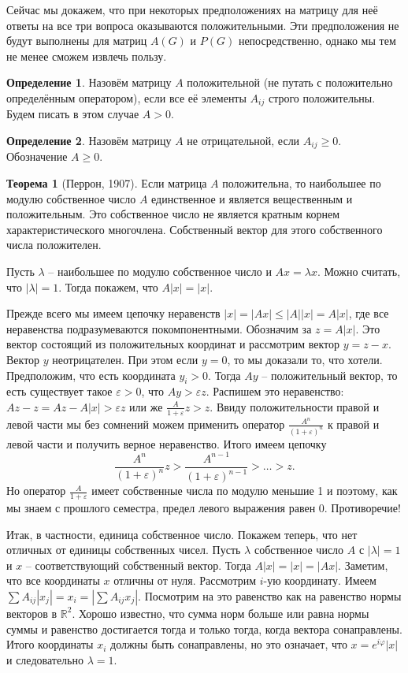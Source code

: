\documentclass[10pt,a4paper,oneside]{book}
\theoremstyle{definition}
\newtheorem*{defn}{Определение}
\newtheorem{thm}{Теорема}
\newcommand{\mb}[1]{\mathbb{#1}}
\def\ffi{\varphi}
\def\eps{\varepsilon}
\def\thrm{\begin{thm}}
\def\ethrm{\end{thm}}
\def\dfn{\begin{defn}}
\def\edfn{\end{defn}}
\begin{document}
Сейчас мы докажем, что при некоторых предположениях на матрицу для неё ответы на все три вопроса оказываются положительными. Эти предположения не будут выполнены для матриц $A(G)$ и  $P(G)$ непосредственно, однако мы тем не менее сможем извлечь пользу.

\dfn Назовём матрицу $A$ положительной (не путать с положительно определённым оператором), если все её элементы $A_{ij}$ строго положительны. Будем писать в этом случае $A>0$.
\edfn

\dfn Назовём матрицу  $A$ не отрицательной, если $A_{ij}\geq 0$. Обозначение $A \geq 0$.
\edfn

\thrm[Перрон, 1907] Если матрица $A$ положительна, то наибольшее по модулю собственное число $A$ единственное и является вещественным и положительным. Это собственное число не является кратным корнем характеристического многочлена. Собственный вектор для этого собственного числа положителен.
\ethrm
\proof Пусть $\lambda$ -- наибольшее по модулю собственное число и $Ax=\lambda x$. Можно считать, что $|\lambda|=1$. Тогда покажем, что $A|x|=|x|$.

Прежде всего мы имеем цепочку неравенств $|x|=|Ax|\leq |A||x|=A|x|$, где все неравенства подразумеваются покомпонентными. Обозначим за $z=A|x|$. Это вектор состоящий из положительных координат и рассмотрим вектор $y=z-x$. Вектор $y$ неотрицателен. При этом если $y=0$, то мы доказали то, что хотели. Предположим, что есть координата $y_i>0$. Тогда $Ay$ -- положительный вектор, то есть существует такое $\eps>0$, что $Ay>\eps z$. Распишем это неравенство: $Az - z= Az-A|x|> \eps z$ или же $\frac{A}{1+\eps}z>z$. Ввиду положительности правой и левой части мы без сомнений можем применить оператор $\frac{A^n}{(1+\eps)^n}$ к правой и левой части и получить верное неравенство. Итого имеем цепочку 
$$\frac{A^n}{(1+\eps)^n}z>\frac{A^{n-1}}{(1+\eps)^{n-1}}> \dots > z.$$
Но оператор $\frac{A}{1+\eps}$ имеет собственные числа по модулю меньшие 1 и поэтому, как мы знаем с прошлого семестра, предел левого выражения равен 0. Противоречие!

Итак, в частности, единица собственное число. Покажем теперь, что нет отличных от единицы собственных чисел. Пусть $\lambda$ собственное число $A$ с $|\lambda|=1$ и $x$ -- соответствующий собственный вектор. Тогда $A|x|=|x|=|Ax|$. Заметим, что все координаты $x$ отличны от нуля. Рассмотрим $i$-ую координату. Имеем $\sum A_{ij}|x_j|=x_i=|\sum A_{ij}x_j|$. Посмотрим на это равенство как на равенство нормы векторов в $\mb R^2$. Хорошо известно, что сумма норм больше или равна нормы суммы и равенство достигается тогда и только тогда, когда вектора сонаправлены. Итого координаты $x_i$ должны быть сонаправлены, но это означает, что $x=e^{i\ffi} |x|$ и следовательно $\lambda=1$. 
\end{document}
